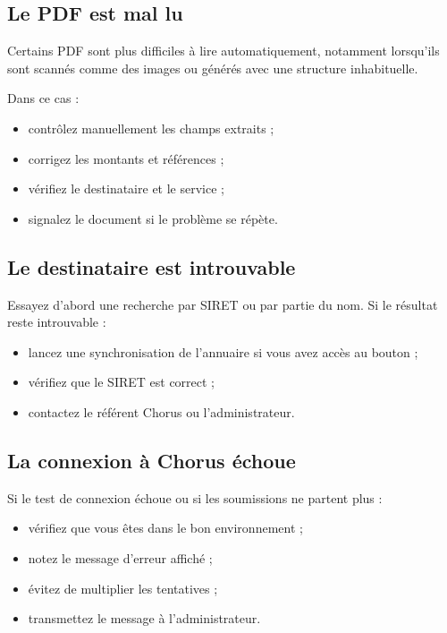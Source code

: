 \documentclass[11pt,a4paper]{article}
\begin{document}
\subsection{Le PDF est mal lu}

Certains PDF sont plus difficiles à lire automatiquement, notamment lorsqu'ils
sont scannés comme des images ou générés avec une structure inhabituelle.

Dans ce cas :

\begin{itemize}
  \item contrôlez manuellement les champs extraits ;
  \item corrigez les montants et références ;
  \item vérifiez le destinataire et le service ;
  \item signalez le document si le problème se répète.
\end{itemize}

\subsection{Le destinataire est introuvable}

Essayez d'abord une recherche par SIRET ou par partie du nom. Si le résultat
reste introuvable :

\begin{itemize}
  \item lancez une synchronisation de l'annuaire si vous avez accès au bouton ;
  \item vérifiez que le SIRET est correct ;
  \item contactez le référent Chorus ou l'administrateur.
\end{itemize}

\subsection{La connexion à Chorus échoue}

Si le test de connexion échoue ou si les soumissions ne partent plus :

\begin{itemize}
  \item vérifiez que vous êtes dans le bon environnement ;
  \item notez le message d'erreur affiché ;
  \item évitez de multiplier les tentatives ;
  \item transmettez le message à l'administrateur.
\end{itemize}
\end{document}
